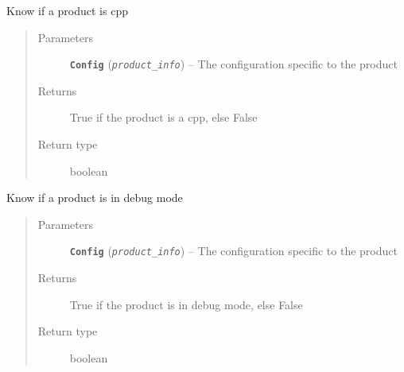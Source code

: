 \documentclass[a4paper,10pt,english]{sphinxmanual}
\begin{document}
\begin{fulllineitems}
\label{commands/apidoc/src:src.product.product_is_cpp}
Know if a product is cpp
\begin{quote}\begin{description}
\item[{Parameters}] \leavevmode
\textbf{\texttt{Config}} (\emph{\texttt{product\_info}}) -- The configuration specific to 
the product

\item[{Returns}] \leavevmode
True if the product is a cpp, else False

\item[{Return type}] \leavevmode
boolean

\end{description}\end{quote}

\end{fulllineitems}


\begin{fulllineitems}
\label{commands/apidoc/src:src.product.product_is_debug}
Know if a product is in debug mode
\begin{quote}\begin{description}
\item[{Parameters}] \leavevmode
\textbf{\texttt{Config}} (\emph{\texttt{product\_info}}) -- The configuration specific to 
the product

\item[{Returns}] \leavevmode
True if the product is in debug mode, else False

\item[{Return type}] \leavevmode
boolean

\end{description}\end{quote}

\end{fulllineitems}

\end{document}

